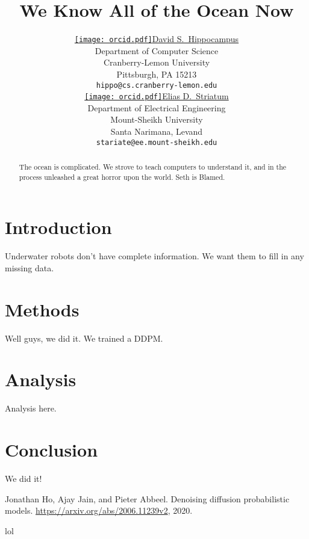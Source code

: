 \documentclass{article}
\title{We Know All of the Ocean Now}
\author{ \href{https://orcid.org/0000-0000-0000-0000}{\texttt{[image: orcid.pdf]}\hspace{1mm}David S.~Hippocampus} \\
	Department of Computer Science\\
	Cranberry-Lemon University\\
	Pittsburgh, PA 15213 \\
	\texttt{hippo@cs.cranberry-lemon.edu} \\
	\And
	\href{https://orcid.org/0000-0000-0000-0000}{\texttt{[image: orcid.pdf]}\hspace{1mm}Elias D.~Striatum} \\
	Department of Electrical Engineering\\
	Mount-Sheikh University\\
	Santa Narimana, Levand \\
	\texttt{stariate@ee.mount-sheikh.edu} \\
}
\begin{document}
\maketitle


\begin{abstract}
	The ocean is complicated. We strove to teach computers to understand it, and in the process unleashed a great horror upon the world. Seth is Blamed.
\end{abstract}




\section{Introduction}

Underwater robots don't have complete information. We want them to fill in any missing data.



\section{Methods}

Well guys, we did it. We trained a DDPM.


\section{Analysis}

Analysis here.


\section{Conclusion}

We did it!





\begin{thebibliography}{1}

        Jonathan Ho, Ajay Jain, and Pieter Abbeel. Denoising diffusion probabilistic models. \href{https://arxiv.org/abs/2006.11239v2}{https://arxiv.org/abs/2006.11239v2}, 2020.

        lol


\end{thebibliography}
\end{document}
